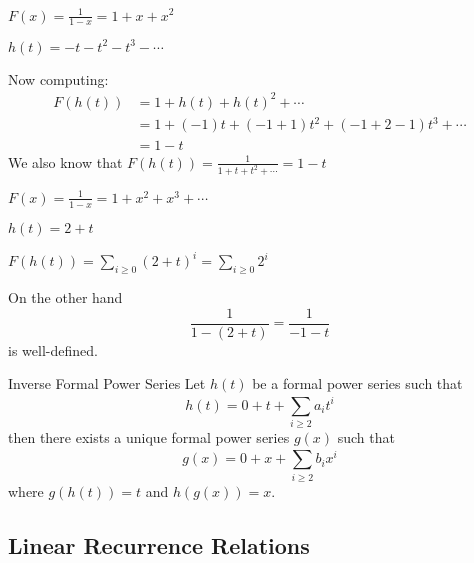 \documentclass{report}
\begin{document}
\begin{examples}
    \begin{example}
        $F(x) = \frac{1}{1 - x} = 1 + x + x^{2}$

        $h(t) = -t - t^{2} - t^{3} - \cdots $

        Now computing:
            \begin{align*}
                F(h(t)) &= 1 + h(t) + h(t)^{2} + \cdots                  \\
                        &= 1 + (-1)t + (-1 + 1)t^{2} + (-1 + 2 - 1)t^{3} + \cdots \\
                        &= 1 - t                         
            \end{align*}
        We also know that $F(h(t)) = \frac{1}{1 + t + t^{2} + \cdots } = 1 - t$
    \end{example}
    \begin{example}
        $F(x) = \frac{1}{1 - x} = 1 + x^{2} + x^{3} + \cdots $

        $h(t) = 2 + t$

        $F(h(t)) = \sum_{i \geq 0}^{} (2 + t)^{i} = \sum_{i \geq 0}^{} 2^{i}$

        On the other hand
            \begin{equation*}
                \dfrac{1}{1 - (2 + t)} = \dfrac{1}{-1 - t}
            \end{equation*}
        is well-defined.
    \end{example}
\end{examples}

\begin{theorem}{Inverse Formal Power Series}
    Let $h(t)$ be a formal power series such that
        \begin{equation*}
            h(t) = 0 + t + \sum_{i \geq 2}^{} a_{i}t^{i}
        \end{equation*}
    then there exists a unique formal power series $g(x)$ such that
        \begin{equation*}
            g(x) = 0 + x + \sum_{i \geq 2}^{} b_{i}x^{i}
        \end{equation*}
    where $g(h(t)) = t$ and $h(g(x)) = x$.
\end{theorem}

\begin{topic}
    \section{Linear Recurrence Relations}
\end{topic}
\end{document}
